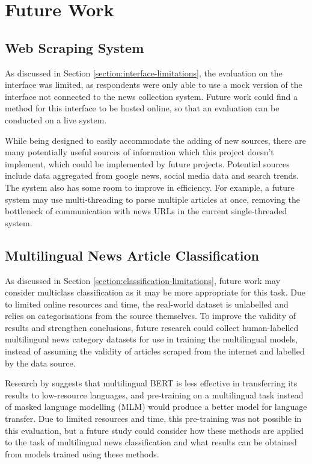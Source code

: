 \documentclass{l4proj}
\begin{document}
\section{Future Work}
\subsection{Web Scraping System}
As discussed in Section \ref{section:interface-limitations}, the evaluation on the interface was limited, as respondents were only able to use a mock version of the interface not connected to the news collection system. Future work could find a method for this interface to be hosted online, so that an evaluation can be conducted on a live system. \par
While being designed to easily accommodate the adding of new sources, there are many potentially useful sources of information which this project doesn't implement, which could be implemented by future projects. Potential sources include data aggregated from google news, social media data and search trends. The system also has some room to improve in efficiency. For example, a future system may use multi-threading to parse multiple articles at once, removing the bottleneck of communication with news URLs in the current single-threaded system. 
\subsection{Multilingual News Article Classification}
As discussed in Section \ref{section:classification-limitations}, future work may consider multiclass classification as it may be more appropriate for this task. Due to limited online resources and time, the real-world dataset is unlabelled and relies on categorisations from the source themselves. To improve the validity of results and strengthen conclusions, future research could collect human-labelled multilingual news category datasets for use in training the multilingual models, instead of assuming the validity of articles scraped from the internet and labelled by the data source. \par
Research by \cite{wu2020all} suggests that multilingual BERT is less effective in transferring its results to low-resource languages, and pre-training on a multilingual task instead of masked language modelling (MLM) would produce a better model for language transfer. Due to limited resources and time, this pre-training was not possible in this evaluation, but a future study could consider how these methods are applied to the task of multilingual news classification and what results can be obtained from models trained using these methods. 
\end{document}
